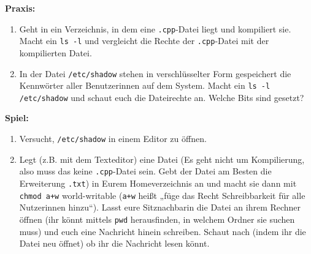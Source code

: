 \textbf{Praxis:}
\begin{enumerate}
    \item Geht in ein Verzeichnis, in dem eine \texttt{.cpp}-Datei liegt und
        kompiliert sie. Macht ein \texttt{ls -l} und vergleicht die Rechte der
        \texttt{.cpp}-Datei mit der kompilierten Datei.
    \item In der Datei \texttt{/etc/shadow} stehen in verschlüsselter Form
        gespeichert die Kennwörter aller Benutzerinnen auf dem System. Macht ein
        \texttt{ls -l /etc/shadow} und schaut euch die Dateirechte an. Welche
        Bits sind gesetzt?
\end{enumerate}

\textbf{Spiel:}
\begin{enumerate}
    \item Versucht, \texttt{/etc/shadow} in einem Editor zu öffnen.
    \item Legt (z.B. mit dem Texteditor) eine Datei (Es geht nicht um
        Kompilierung, also muss das keine \texttt{.cpp}-Datei sein. Gebt der
        Datei am Besten die Erweiterung \texttt{.txt}) in Eurem Homeverzeichnis
        an und macht sie dann mit \texttt{chmod a+w} world-writable
        (\texttt{a+w} heißt „füge das Recht Schreibbarkeit für alle Nutzerinnen
        hinzu“).  Lasst eure Sitznachbarin die Datei an ihrem Rechner öffnen
        (ihr könnt mittels \texttt{pwd} herausfinden, in welchem Ordner sie
        suchen muss) und euch eine Nachricht hinein schreiben. Schaut nach
        (indem ihr die Datei neu öffnet) ob ihr die Nachricht lesen könnt.
\end{enumerate}
